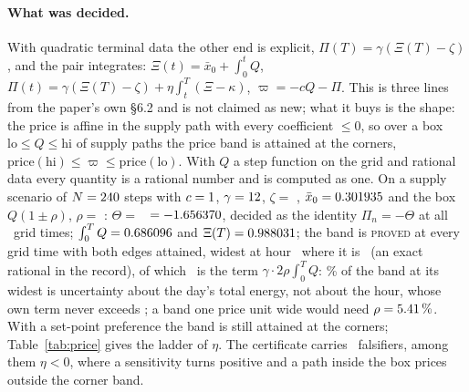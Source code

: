 \documentclass[11pt]{article}
\begin{document}
\paragraph{What was decided.} With quadratic terminal data the other end is explicit, $\Pi(T) = \gamma(\Xi(T) - \zeta)$, and the pair integrates: $\Xi(t) = \bar x_0 + \int_0^t Q$, $\Pi(t) = \gamma(\Xi(T) - \zeta) + \eta\int_t^T(\Xi - \kappa)$, $\varpi = -cQ - \Pi$. This is three lines from the paper's own \S6.2 and is not claimed as new; what it buys is the shape: the price is affine in the supply path with every coefficient $\le 0$, so over a box $\mathrm{lo} \le Q \le \mathrm{hi}$ of supply paths the price band is attained at the corners, $\mathrm{price}(\mathrm{hi}) \le \varpi \le \mathrm{price}(\mathrm{lo})$. With $Q$ a step function on the grid and rational data every quantity is a rational number and is computed as one. On a supply scenario of $N = 240$ steps with $c = 1$, $\gamma = 12$, $\zeta = $ \PRZeta, $\bar x_0 = 0.301935$ and the box $Q(1 \pm \rho)$, $\rho = $ \PRRhoFrac: $\Theta = $ \PRThetaExact\ $= -1.656370$, decided as the identity $\Pi_n = -\Theta$ at all \PRGridTimes\ grid times; $\int_0^T Q = 0.686096$ and $\Xi(T) = 0.988031$; the band is \textsc{proved} at every grid time with both edges attained, widest at hour \PRWidestHour\ where it is \PRWidest\ (an exact rational in the record), of which \PRDayPart\ is the term $\gamma\cdot 2\rho\int_0^T Q$: \PRDayShare\% of the band at its widest is uncertainty about the day's total energy, not about the hour, whose own term never exceeds \PRInstMax; a band one price unit wide would need $\rho = 5.41\,\%$. With a set-point preference the band is still attained at the corners; Table~\ref{tab:price} gives the ladder of $\eta$. The certificate carries \PRFalsifiers\ falsifiers, among them $\eta < 0$, where a sensitivity turns positive and a path inside the box prices outside the corner band.
\end{document}
